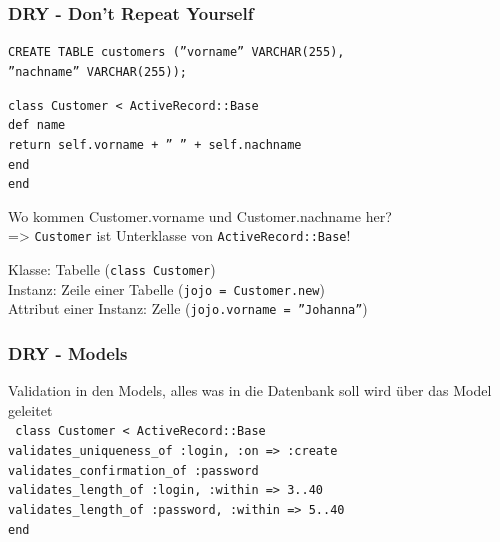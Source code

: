 \begin{frame}
  \frametitle{DRY - Don't Repeat Yourself}
  {\tt \small CREATE TABLE customers (''vorname'' VARCHAR(255),} \\
  {\tt \small \enskip ''nachname'' VARCHAR(255));} \\
  \vspace{0.3cm}

  {\tt \small class Customer < ActiveRecord::Base} \\
  {\tt \small \enskip def name} \\
  {\tt \small \enskip \enskip return self.vorname + '' '' + self.nachname} \\
  {\tt \small \enskip end} \\
  {\tt \small end} \\
  \vspace{0.3cm}
  \pause

  \begin{center}
  Wo kommen Customer.vorname und Customer.nachname her? \\
  \pause
  \vspace{0.1cm}
  => {\tt Customer} ist Unterklasse von {\tt ActiveRecord::Base}! \\
  \vspace{0.3cm}
  \end{center}
  Klasse: Tabelle ({\tt class Customer}) \\
  Instanz: Zeile einer Tabelle ({\tt jojo = Customer.new}) \\
  Attribut einer Instanz: Zelle ({\tt jojo.vorname = ''Johanna''})
\end{frame}

\begin{frame}
  \frametitle{DRY - Models}
  Validation in den Models, alles was in die Datenbank soll wird über das Model geleitet \\
  \tt \small
  \vspace{0.5cm}
  class Customer < ActiveRecord::Base \\
  \enskip validates\_uniqueness\_of :login, :on => :create \\
  \enskip validates\_confirmation\_of :password \\
  \enskip validates\_length\_of :login, :within => 3..40 \\
  \enskip validates\_length\_of :password, :within => 5..40 \\
  end
\end{frame}

